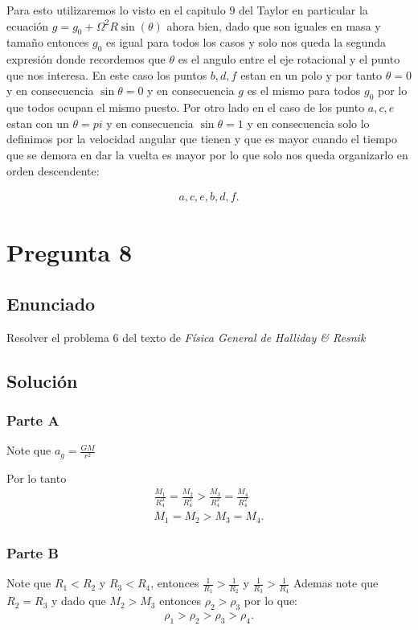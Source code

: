 \documentclass[12pt]{article}
\begin{document}
Para esto utilizaremos lo visto en el capitulo $9$ del Taylor en particular la ecuación $g=g_{0} + \Omega^2R\sin\left( \theta \right) $ ahora bien, dado que son iguales en masa y tamaño entonces $g_{0}$ es igual para todos los casos y solo nos queda  la segunda expresión donde recordemos que $\theta$ es el angulo entre el eje rotacional y el punto que nos interesa. En este caso los puntos $b,d,f$ estan en un polo y por tanto $\theta = 0$ y en consecuencia $\sin\theta = 0$ y en consecuencia $g$ es el mismo para todos $g_{0}$ por lo que todos ocupan el mismo puesto. Por otro lado en el caso de los punto $a,c,e$ estan con un $\theta = pi$ y en consecuencia $\sin\theta = 1$ y en consecuencia solo lo definimos por la velocidad angular que tienen y que es mayor cuando el tiempo que se demora en dar la vuelta es mayor por lo que solo nos queda organizarlo en orden descendente:

\begin{align*}
  a,c,e,b,d,f
.\end{align*}


\section*{Pregunta 8}

\subsection*{Enunciado}

Resolver el problema $6$ del texto de \textit{Física General de Halliday \& Resnik}

\subsection*{Solución}

\subsubsection*{Parte A}

Note que $a_{g}=\frac{GM}{r^2}$ 

Por lo tanto 
\begin{align*}
  \frac{M_1}{R_4^2}=\frac{M_2}{R_4^2}>\frac{M_3}{R_4^2}=\frac{M_4}{R_4^2}\\
  M_1=M_2>M_3=M_4
.\end{align*}

\subsubsection*{Parte B}

Note que $R_1<R_2$ y $R_3<R_4$, entonces $\frac{1}{R_1}>\frac{1}{R_2}$ y $\frac{1}{R_3}>\frac{1}{R_4}$ Ademas note que $R_2=R_3$ y dado que $M_2>M_3$ entonces $\rho_2>\rho_3$ por lo que:
\begin{align*}
  \rho_1>\rho_2>\rho_3>\rho_4
.\end{align*}
\end{document}
